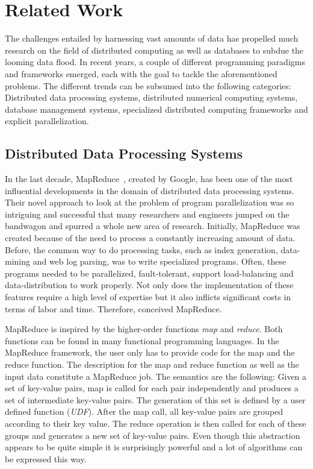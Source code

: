 \chapter{Related Work}
\label{cha:relatedwork}


The challenges entailed by harnessing vast amounts of data has propelled much research on the field of distributed computing as well as databases to subdue the looming data flood.
In recent years, a couple of different programming paradigms and frameworks emerged, each with the goal to tackle the aforementioned problems.
The different trends can be subsumed into the following categories: Distributed data processing systems, distributed numerical computing systems, database management systems, specialized distributed computing frameworks and explicit parallelization.

\section{Distributed Data Processing Systems}

In the last decade, MapReduce~\cite{dean:c2008a}, created by Google, has been one of the most influential developments in the domain of distributed data processing systems.
Their novel approach to look at the problem of program parallelization was so intriguing and successful that many researchers and engineers jumped on the bandwagon and spurred a whole new area of research.
Initially, MapReduce was created because of the need to process a constantly increasing amount of data.
Before, the common way to do processing tasks, such as index generation, data-mining and web log parsing, was to write specialized programs.
Often, these programs needed to be parallelized, fault-tolerant, support load-balancing and data-distribution to work properly.
Not only does the implementation of these features require a high level of expertise but it also inflicts significant costs in terms of labor and time.
Therefore, \citeauthor{dean:c2008a} conceived MapReduce.

MapReduce is inspired by the higher-order functions \emph{map} and \emph{reduce}.
Both functions can be found in many functional programming languages.
In the MapReduce framework, the user only has to provide code for the map and the reduce function.
The description for the map and reduce function as well as the input data constitute a MapReduce job.
The semantics are the following:
Given a set of key-value pairs, map is called for each pair independently and produces a set of intermediate key-value pairs.
The generation of this set is defined by a user defined function (\emph{UDF}).
After the map call, all key-value pairs are grouped according to their key value.
The reduce operation is then called for each of these groups and generates a new set of key-value pairs.
Even though this abstraction appears to be quite simple it is surprisingly powerful and a lot of algorithms can be expressed this way.

